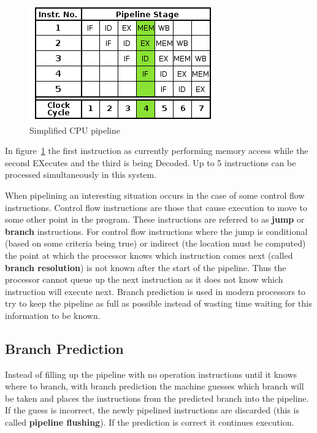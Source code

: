 \documentclass[english,a4paper,12pt]{report}
\begin{document}
\begin{figure}[tph]
  \centering
  \includegraphics[scale=0.5]{pipeline}
  \caption[Simplified CPU pipeline]{Simplified CPU pipeline \cite{pipeline}}
  \label{fig:pipeline}
\end{figure}

In figure~\ref{fig:pipeline} the first instruction as
currently performing memory access while the second EXecutes and the
third is being Decoded. Up to 5 instructions can be processed
simultaneously in this system.

When pipelining an interesting situation occurs in the case of some
control flow instructions. Control flow instructions are those that
cause execution to move to some other point in the program. These
instructions are referred to as \textbf{jump} or \textbf{branch}
instructions. For control flow instructions where the jump is
conditional (based on some criteria being true) or indirect (the
location must be computed) the point at which the processor knows
which instruction comes next (called \textbf{branch resolution}) is
not known after the start of the pipeline. Thus the processor cannot
queue up the next instruction as it does not know which instruction
will execute next. Branch prediction is used in modern processors to
try to keep the pipeline as full as possible instead of wasting time
waiting for this information to be known.

\subsection{Branch Prediction}

Instead of filling up the pipeline with no operation instructions
until it knows where to branch, with branch prediction the machine
guesses which branch will be taken and places the instructions from
the predicted branch into the pipeline. If the guess is incorrect, the
newly pipelined instructions are discarded (this is called \textbf{pipeline
  flushing}). If the prediction is correct it continues execution.
\end{document}
